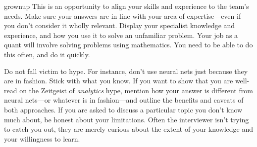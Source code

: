\begin{answer}{grownup}
This is an opportunity to align your skills and experience to the team's needs.
Make sure your answers are in line with your area of expertise---even if you don't consider it wholly relevant.
Display your specialist knowledge and experience, and how you use it to solve an unfamiliar problem.
Your job as a quant will involve solving problems using mathematics.
You need to be able to do this often, and do it quickly.

Do not fall victim to hype.
For instance, don't use neural nets just because they are in fashion.
Stick with what you know.
If you want to show that you are well-read on the Zeitgeist of \emph{analytics} hype, mention how your answer is different from neural nets---or whatever is in fashion---and outline the benefits and caveats of both approaches.
If you are asked to discuss a particular topic you don't know much about, be honest about your limitations.
Often the interviewer isn't trying to catch you out, they are merely curious about the extent of your knowledge and your willingness to learn.

\end{answer}

